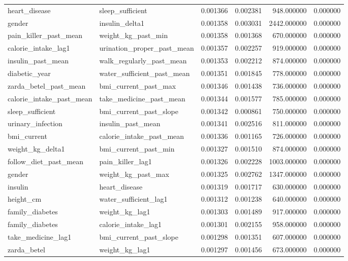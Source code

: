 \begin{longtable}{llrrrr}
heart\_disease & sleep\_sufficient & 0.001366 & 0.002381 & 948.000000 & 0.000000 \\
gender & insulin\_delta1 & 0.001358 & 0.003031 & 2442.000000 & 0.000000 \\
pain\_killer\_past\_mean & weight\_kg\_past\_min & 0.001358 & 0.001368 & 670.000000 & 0.000000 \\
calorie\_intake\_lag1 & urination\_proper\_past\_mean & 0.001357 & 0.002257 & 919.000000 & 0.000000 \\
insulin\_past\_mean & walk\_regularly\_past\_mean & 0.001353 & 0.002212 & 874.000000 & 0.000000 \\
diabetic\_year & water\_sufficient\_past\_mean & 0.001351 & 0.001845 & 778.000000 & 0.000000 \\
zarda\_betel\_past\_mean & bmi\_current\_past\_max & 0.001346 & 0.001438 & 736.000000 & 0.000000 \\
calorie\_intake\_past\_mean & take\_medicine\_past\_mean & 0.001344 & 0.001577 & 785.000000 & 0.000000 \\
sleep\_sufficient & bmi\_current\_past\_slope & 0.001342 & 0.000861 & 750.000000 & 0.000000 \\
urinary\_infection & insulin\_past\_mean & 0.001341 & 0.002516 & 811.000000 & 0.000000 \\
bmi\_current & calorie\_intake\_past\_mean & 0.001336 & 0.001165 & 726.000000 & 0.000000 \\
weight\_kg\_delta1 & bmi\_current\_past\_min & 0.001327 & 0.001510 & 874.000000 & 0.000000 \\
follow\_diet\_past\_mean & pain\_killer\_lag1 & 0.001326 & 0.002228 & 1003.000000 & 0.000000 \\
gender & weight\_kg\_past\_max & 0.001325 & 0.002762 & 1347.000000 & 0.000000 \\
insulin & heart\_disease & 0.001319 & 0.001717 & 630.000000 & 0.000000 \\
height\_cm & water\_sufficient\_lag1 & 0.001312 & 0.001238 & 640.000000 & 0.000000 \\
family\_diabetes & weight\_kg\_lag1 & 0.001303 & 0.001489 & 917.000000 & 0.000000 \\
family\_diabetes & calorie\_intake\_lag1 & 0.001301 & 0.002155 & 958.000000 & 0.000000 \\
take\_medicine\_lag1 & bmi\_current\_past\_slope & 0.001298 & 0.001351 & 607.000000 & 0.000000 \\
zarda\_betel & weight\_kg\_lag1 & 0.001297 & 0.001456 & 673.000000 & 0.000000 \\

\end{longtable}
